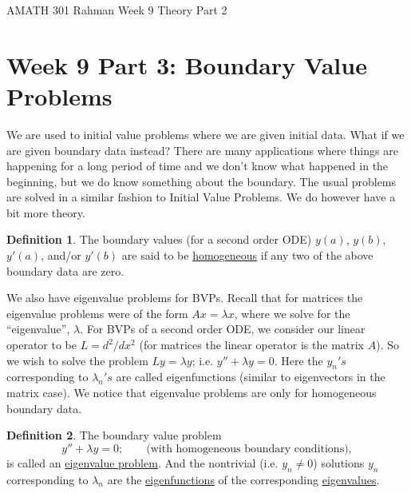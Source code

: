 \documentclass[reqno]{amsart}
\theoremstyle{definition}
\newtheorem{definition}{Definition}
\begin{document}
\begin{flushleft}
{\sc \Large AMATH 301 Rahman} \hfill Week 9 Theory Part 2
\bigskip
\end{flushleft}

\newcommand{\R}{\mathbb{R}}
\newcommand{\N}{\mathbb{N}}
\newcommand{\Z}{\mathbb{Z}}
\newcommand{\Q}{\mathbb{Q}}
\renewcommand{\CancelColor}{\color{red}}
\newcommand{\?}{\stackrel{?}{=}}
\renewcommand{\varphi}{\phi}
\newcommand{\card}{\text{Card}}
\newcommand{\bigzero}{\text{\Huge 0}}
\newcommand{\curvearrowdown}{{\color{red}\rotatebox{90}{$\curvearrowleft$}}}
\newcommand{\curvearrowup}{{\color{red}\rotatebox{90}{$\curvearrowright$}}}



\section*{Week 9 Part 3:  Boundary Value Problems}

We are used to initial value problems where we are given initial data.  What if we are given boundary
data instead?  There are many applications where things are happening for a long period of time and
we don't know what happened in the beginning, but we do know something about the boundary.
The usual problems are solved in a similar fashion to Initial Value Problems.  We do however have
a bit more theory.

\begin{definition}
The boundary values (for a second order ODE) $y(a)$, $y(b)$, $y'(a)$, and/or $y'(b)$
are said to be \underline{homogeneous} if any two of the above boundary data are zero.
\end{definition}

We also have eigenvalue problems for BVPs.  Recall that for matrices the eigenvalue problems
were of the form $Ax = \lambda x$, where we solve for the ``eigenvalue'', $\lambda$.
For BVPs of a second order ODE, we consider our linear operator to be $L = d^2/dx^2$
(for matrices the linear operator is the matrix $A$).  So we wish to solve the problem
$Ly = \lambda y$; i.e. $y'' + \lambda y = 0$.  Here the $y_n's$ corresponding to $\lambda_n's$
are called eigenfunctions (similar to eigenvectors in the matrix case).  We notice that eigenvalue
problems are only for homogeneous boundary data.

\begin{definition}
The boundary value problem
%
\begin{equation}
y'' + \lambda y = 0; \qquad \text{(with homogeneous boundary conditions)},
\end{equation}
%
is called an \underline{eigenvalue problem}.  And the nontrivial (i.e. $y_n \neq 0$) solutions
$y_n$ corresponding to $\lambda_n$ are the \underline{eigenfunctions} of the corresponding
\underline{eigenvalues}.
\end{definition}
\end{document}
